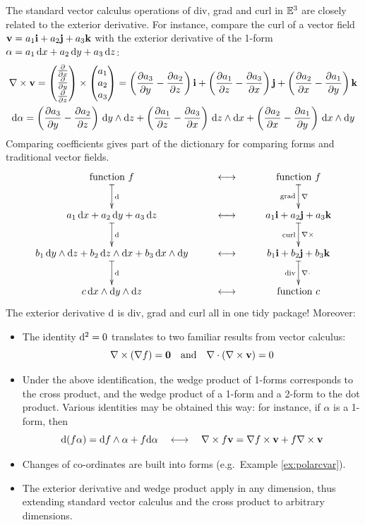 
The standard vector calculus operations of div, grad and curl in $\E^3$ are closely related to the exterior derivative. For instance, compare the curl of a vector field $\vv=a_1\vi+a_2\vj+a_3\vk$ with the exterior derivative of the 1-form $\alpha=a_1\,\dx+a_2\,\dy+a_3\,\dz$:
\begin{gather*}
	\nabla\times\vv=
	\threevec{\partials{x}}{\partials{y}}{\partials{z}}\times\threevec{a_1}{a_2}{a_3}
	=\left(\partials[a_3]{y}-\partials[a_2]{z}\right)\vi+ \left(\partials[a_1]{z}-\partials[a_3]{x}\right)\vj+ \left(\partials[a_2]{x}-\partials[a_1]{y}\right)\vk\\
	\D\alpha=\left(\partials[a_3]{y}-\partials[a_2]{z}\right)\,\dy\wedge\dz +\left(\partials[a_1]{z}-\partials[a_3]{x}\right)\,\dz\wedge\dx +\left(\partials[a_2]{x}-\partials[a_1]{y}\right)\,\dx\wedge\dy
\end{gather*}
Comparing coefficients gives part of the dictionary for comparing forms and traditional vector fields.
\[
	\xymatrix{
		\text{function }f \ar@{|->}[d]^{\D} & \longleftrightarrow & \text{function }f \ar@{|->}[d]^{\nabla}_{\text{grad}}\\
		a_1\,\dx+a_2\,\dy+a_3\,\dz \ar@{|->}[d]^{\D} & \longleftrightarrow & a_1\vi+a_2\vj+ a_3\vk \ar@{|->}[d]^{\nabla\times}_{\text{curl}}\\
		b_1\,\dy\wedge\dz+b_2\,\dz\wedge\dx+b_3\,\dx\wedge\dy \ar@{|->}[d]^{\D} & \longleftrightarrow & b_1\vi+b_2\vj+b_3\vk \ar@{|->}[d]^{\nabla\cdot}_{\text{div}}\\
		c\,\dx\wedge\dy\wedge\dz & \longleftrightarrow & \text{function }c
	}
\]
The exterior derivative $\D$ is div, grad and curl all in one tidy package! Moreover:

\begin{itemize}
  \item The identity $\D^2=0$ translates to two familiar results from vector calculus:
  \[
  	\nabla\times(\nabla f)=\V0\quad\text{and}\quad\nabla\cdot(\nabla\times\vv)=0
  \]
  
  \item Under the above identification, the wedge product of 1-forms corresponds to the cross product, and the wedge product of a 1-form and a 2-form to the dot product. Various identities may be obtained this way: for instance, if $\alpha$ is a 1-form, then
  \[
  	\D(f\alpha)=\df\wedge\alpha+f\D\alpha \quad\longleftrightarrow
\quad\nabla\times f\vv=\nabla f\times\vv+f\nabla\times\vv
	\]
	 	
  \item Changes of co-ordinates are built into forms (e.g.\ Example \ref{ex:polarcvar}).
  
  \item The exterior derivative and wedge product apply in any dimension, thus extending standard vector calculus and the cross product to arbitrary dimensions. 
\end{itemize}

